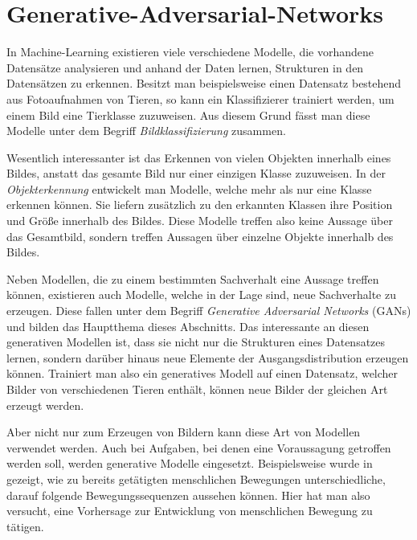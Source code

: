 \chapter{Generative-Adversarial-Networks}\label{chapter:gans}
In Machine-Learning existieren viele verschiedene Modelle, die vorhandene
Datensätze analysieren und anhand der Daten lernen, Strukturen in den
Datensätzen zu erkennen.  Besitzt man beispielsweise einen Datensatz
bestehend aus Fotoaufnahmen von Tieren, so kann ein Klassifizierer trainiert
werden, um einem Bild eine Tierklasse zuzuweisen. Aus diesem Grund fässt man
diese Modelle unter dem Begriff \textit{Bildklassifizierung} zusammen.

Wesentlich interessanter ist das Erkennen von vielen Objekten innerhalb eines
Bildes, anstatt das gesamte Bild nur einer einzigen Klasse zuzuweisen. In der
\textit{Objekterkennung} entwickelt man Modelle, welche mehr als nur eine
Klasse erkennen können. Sie liefern zusätzlich zu den erkannten Klassen ihre
Position und Größe innerhalb des Bildes. Diese Modelle treffen also keine
Aussage über das Gesamtbild, sondern treffen Aussagen über einzelne Objekte
innerhalb des Bildes.

Neben Modellen, die zu einem bestimmten Sachverhalt eine Aussage treffen
können, existieren auch Modelle, welche in der Lage sind, neue Sachverhalte zu
erzeugen. Diese fallen unter dem Begriff \textit{Generative Adversarial
Networks} (GANs) und bilden das Hauptthema dieses Abschnitts. Das interessante
an diesen generativen Modellen ist, dass sie nicht nur die Strukturen eines
Datensatzes lernen, sondern darüber hinaus neue Elemente der
Ausgangsdistribution erzeugen können. Trainiert man also ein generatives
Modell auf einen Datensatz, welcher Bilder von verschiedenen Tieren enthält,
können neue Bilder der gleichen Art erzeugt werden.

Aber nicht nur zum Erzeugen von Bildern kann diese Art von Modellen verwendet
werden. Auch bei Aufgaben, bei denen eine Voraussagung getroffen werden soll,
werden generative Modelle eingesetzt. Beispielsweise wurde in
\cite{barsoum2017hpgan} gezeigt, wie zu bereits getätigten menschlichen
Bewegungen unterschiedliche, darauf folgende Bewegungssequenzen aussehen
können. Hier hat man also versucht, eine Vorhersage zur Entwicklung von
menschlichen Bewegung zu tätigen.

